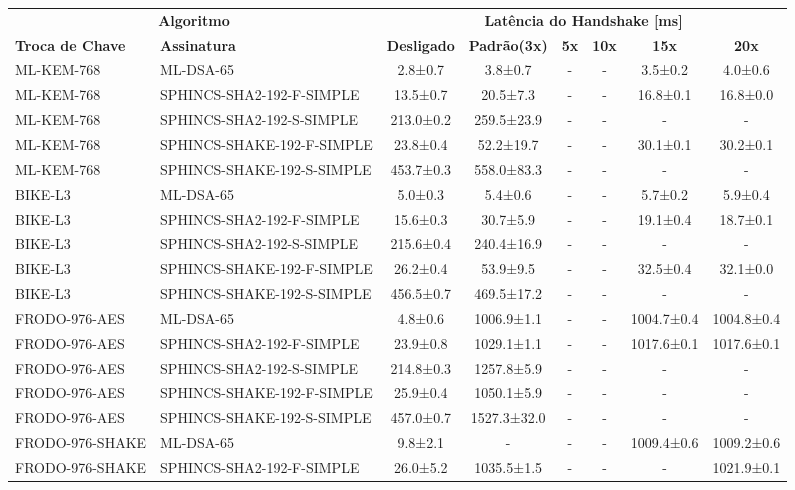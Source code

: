 \documentclass[10pt]{article}
\begin{document}
\centering
\small
\begin{tabular}{@{}l l c c c c c c@{}}
\toprule
\multicolumn{2}{c}{\textbf{Algoritmo}} & \multicolumn{6}{c}{\textbf{Latência do Handshake [ms]}} \\
\cmidrule(lr){1-2}\cmidrule(lr){3-8}
\textbf{Troca de Chave} & \textbf{Assinatura} & \textbf{Desligado} & \textbf{Padrão(3x)} & \textbf{5x} & \textbf{10x} & \textbf{15x} & \textbf{20x} \\
\midrule
ML-KEM-768 & ML-DSA-65 & 2.8±0.7 & 3.8±0.7 & - & - & 3.5±0.2 & 4.0±0.6 \\
ML-KEM-768 & SPHINCS-SHA2-192-F-SIMPLE & 13.5±0.7 & 20.5±7.3 & - & - & 16.8±0.1 & 16.8±0.0 \\
ML-KEM-768 & SPHINCS-SHA2-192-S-SIMPLE & 213.0±0.2 & 259.5±23.9 & - & - & - & - \\
ML-KEM-768 & SPHINCS-SHAKE-192-F-SIMPLE & 23.8±0.4 & 52.2±19.7 & - & - & 30.1±0.1 & 30.2±0.1 \\
ML-KEM-768 & SPHINCS-SHAKE-192-S-SIMPLE & 453.7±0.3 & 558.0±83.3 & - & - & - & - \\
BIKE-L3 & ML-DSA-65 & 5.0±0.3 & 5.4±0.6 & - & - & 5.7±0.2 & 5.9±0.4 \\
BIKE-L3 & SPHINCS-SHA2-192-F-SIMPLE & 15.6±0.3 & 30.7±5.9 & - & - & 19.1±0.4 & 18.7±0.1 \\
BIKE-L3 & SPHINCS-SHA2-192-S-SIMPLE & 215.6±0.4 & 240.4±16.9 & - & - & - & - \\
BIKE-L3 & SPHINCS-SHAKE-192-F-SIMPLE & 26.2±0.4 & 53.9±9.5 & - & - & 32.5±0.4 & 32.1±0.0 \\
BIKE-L3 & SPHINCS-SHAKE-192-S-SIMPLE & 456.5±0.7 & 469.5±17.2 & - & - & - & - \\
FRODO-976-AES & ML-DSA-65 & 4.8±0.6 & 1006.9±1.1 & - & - & 1004.7±0.4 & 1004.8±0.4 \\
FRODO-976-AES & SPHINCS-SHA2-192-F-SIMPLE & 23.9±0.8 & 1029.1±1.1 & - & - & 1017.6±0.1 & 1017.6±0.1 \\
FRODO-976-AES & SPHINCS-SHA2-192-S-SIMPLE & 214.8±0.3 & 1257.8±5.9 & - & - & - & - \\
FRODO-976-AES & SPHINCS-SHAKE-192-F-SIMPLE & 25.9±0.4 & 1050.1±5.9 & - & - & - & - \\
FRODO-976-AES & SPHINCS-SHAKE-192-S-SIMPLE & 457.0±0.7 & 1527.3±32.0 & - & - & - & - \\
FRODO-976-SHAKE & ML-DSA-65 & 9.8±2.1 & - & - & - & 1009.4±0.6 & 1009.2±0.6 \\
FRODO-976-SHAKE & SPHINCS-SHA2-192-F-SIMPLE & 26.0±5.2 & 1035.5±1.5 & - & - & - & 1021.9±0.1 \\

\end{tabular}
\end{document}
